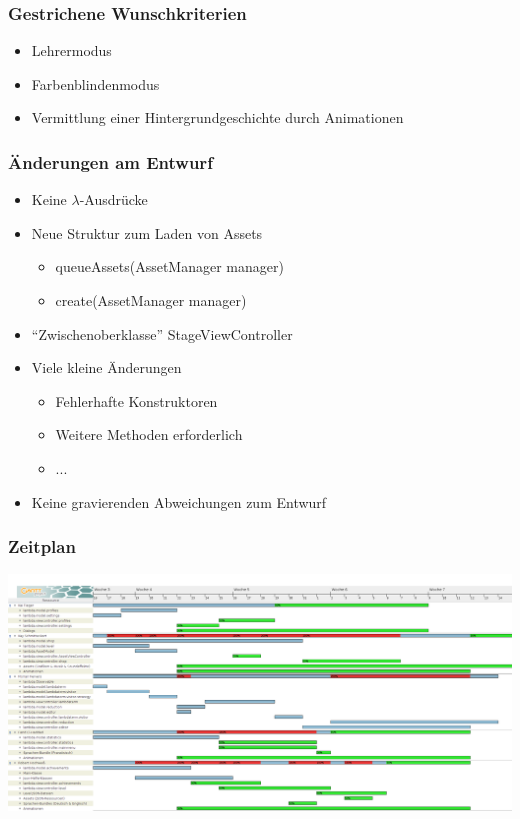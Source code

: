 \documentclass[18pt]{beamer}
\begin{document}
\begin{frame}
	\frametitle{Gestrichene Wunschkriterien}
	\begin{itemize}
		\item Lehrermodus
		\item Farbenblindenmodus
		\item Vermittlung einer Hintergrundgeschichte durch Animationen
	\end{itemize}
\end{frame}

\begin{frame}
	\frametitle{Änderungen am Entwurf}
	\begin{itemize}[<+->]
		\item Keine $\lambda$-Ausdrücke
		\item Neue Struktur zum Laden von Assets
		\begin{itemize}
			\item queueAssets(AssetManager manager)
			\item create(AssetManager manager)
		\end{itemize}
		\item ``Zwischenoberklasse'' StageViewController 
		\item Viele kleine Änderungen
		\begin{itemize}
			\item Fehlerhafte Konstruktoren
			\item Weitere Methoden erforderlich
			\item ...
		\end{itemize}
		\item Keine gravierenden Abweichungen zum Entwurf
	\end{itemize}
\end{frame}

\begin{frame}
	\frametitle{Zeitplan}
	\includegraphics[width=\textwidth]{pictures/Implementierungsplan_ende}
\end{frame}
\end{document}
